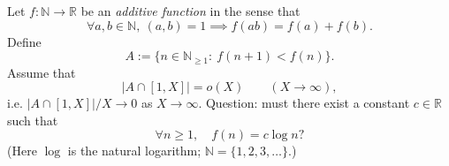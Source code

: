 Let $f:\mathbb{N}\to\mathbb{R}$ be an \emph{additive function} in the sense that
\[
\forall a,b\in\mathbb{N},\ (a,b)=1 \implies f(ab)=f(a)+f(b).
\]
Define
\[
A:=\{n\in\mathbb{N}_{\ge 1}:\ f(n+1)<f(n)\}.
\]
Assume that
\[
\lvert A\cap[1,X]\rvert=o(X)\qquad (X\to\infty),
\]
i.e. $\lvert A\cap[1,X]\rvert/X\to 0$ as $X\to\infty$.
Question: must there exist a constant $c\in\mathbb{R}$ such that
\[
\forall n\ge 1,\quad f(n)=c\log n?
\]
(Here $\log$ is the natural logarithm; $\mathbb{N}=\{1,2,3,\dots\}$.)
